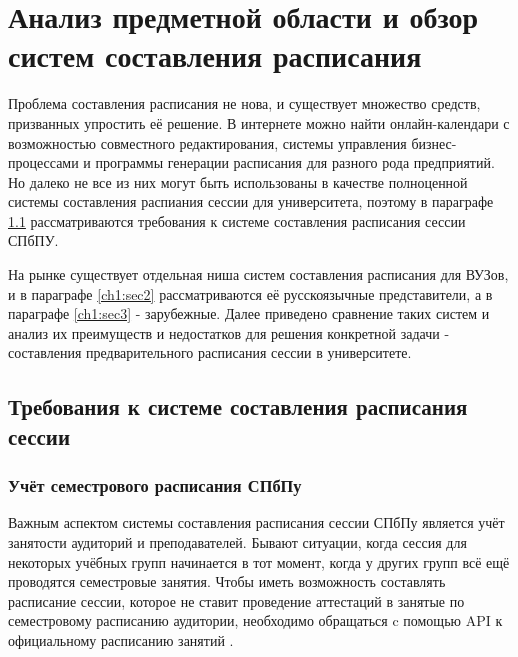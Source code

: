 \chapter{Анализ предметной области и обзор систем составления расписания} \label{ch1}


Проблема составления расписания не нова, и существует множество средств, призванных упростить её решение. В интернете можно найти онлайн-календари с возможностью совместного редактирования, системы управления бизнес-процессами и программы генерации расписания для разного рода предприятий. Но далеко не все из них могут быть использованы в качестве полноценной системы составления распиания сессии для университета, поэтому в параграфе \ref{ch1:sec1} рассматриваются требования к системе составления расписания сессии СПбПУ.

 На рынке существует отдельная ниша систем составления расписания для ВУЗов, и в параграфе \ref{ch1:sec2} рассматриваются её русскоязычные представители, а в параграфе \ref{ch1:sec3} - зарубежные. Далее приведено сравнение таких систем и анализ их преимуществ и недостатков для решения конкретной задачи - составления предварительного расписания сессии в университете.

\section{Требования к системе составления расписания сессии} \label{ch1:sec1}

\subsection{Учёт семестрового расписания СПбПу}

Важным аспектом системы составления расписания сессии СПбПу является учёт занятости аудиторий и преподавателей. Бывают ситуации, когда сессия для некоторых учёбных групп начинается в тот момент, когда у других групп всё ещё проводятся семестровые занятия. Чтобы иметь возможность составлять расписание сессии, которое не ставит проведение аттестаций в занятые по семестровому расписанию аудитории, необходимо обращаться c помощью API к официальному расписанию занятий  \cite{ruz}. 

